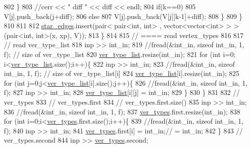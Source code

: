 \begin{DoxyCode}
802         \}
803         \textcolor{comment}{//cerr << " diff " << diff << endl;}
804         \textcolor{keywordflow}{if}(k==0)
805           V[j].push\_back(j+diff);
806         \textcolor{keywordflow}{else}
807           V[j].push\_back(V[j][k-1]+diff);
808       \}
809     \}
810 
811 
812     \hyperlink{classmarked__graph__compressed_a7df5779d313486644132bd816937f532}{star\_edges}.insert(pair< pair<int, int> , vector<vector<int> > > (pair<int, int>(x, xp), V));
813   \}
814 
815   \textcolor{comment}{// ==== read vertex\_types}
816 
817   \textcolor{comment}{// read ver\_type\_list}
818   inp >> int\_in;
819   \textcolor{comment}{//fread(&int\_in, sizeof int\_in, 1, f); // size of ver\_type\_list}
820   \hyperlink{classmarked__graph__compressed_af2e3e55223d436628a02758dfae88493}{ver\_type\_list}.resize(int\_in);
821   \textcolor{keywordflow}{for} (\textcolor{keywordtype}{int} i=0; i<\hyperlink{classmarked__graph__compressed_af2e3e55223d436628a02758dfae88493}{ver\_type\_list}.size();i++)\{
822     inp >> int\_in;
823     \textcolor{comment}{//fread(&int\_in, sizeof int\_in, 1, f); // size of ver\_type\_list[i]}
824     \hyperlink{classmarked__graph__compressed_af2e3e55223d436628a02758dfae88493}{ver\_type\_list}[i].resize(int\_in);
825     \textcolor{keywordflow}{for} (\textcolor{keywordtype}{int} j=0;j<\hyperlink{classmarked__graph__compressed_af2e3e55223d436628a02758dfae88493}{ver\_type\_list}[i].size();j++)\{
826       \textcolor{comment}{//fread(&int\_in, sizeof int\_in, 1, f);}
827       inp >> int\_in;
828       \hyperlink{classmarked__graph__compressed_af2e3e55223d436628a02758dfae88493}{ver\_type\_list}[i][j] = int\_in;
829     \}
830   \}
831 
832   \textcolor{comment}{// ver\_types}
833   \textcolor{comment}{// ver\_types.first}
834   \textcolor{comment}{// ver\_types.first.size()}
835   inp >> int\_in;
836   \textcolor{comment}{//fread(&int\_in, sizeof int\_in, 1, f);}
837   \hyperlink{classmarked__graph__compressed_af446cc5e23c241a92b76642fd5ebc403}{ver\_types}.first.resize(int\_in);
838   \textcolor{keywordflow}{for} (\textcolor{keywordtype}{int} i=0;i<\hyperlink{classmarked__graph__compressed_af446cc5e23c241a92b76642fd5ebc403}{ver\_types}.first.size();i++)\{
839     \textcolor{comment}{//fread(&int\_in, sizeof int\_in, 1, f);}
840     inp >> int\_in;
841     \hyperlink{classmarked__graph__compressed_af446cc5e23c241a92b76642fd5ebc403}{ver\_types}.first[i] = int\_in;\textcolor{comment}{// = int\_in;}
842   \}
843   \textcolor{comment}{// ver\_types.second}
844   inp >> \hyperlink{classmarked__graph__compressed_af446cc5e23c241a92b76642fd5ebc403}{ver\_types}.second;

\end{DoxyCode}
